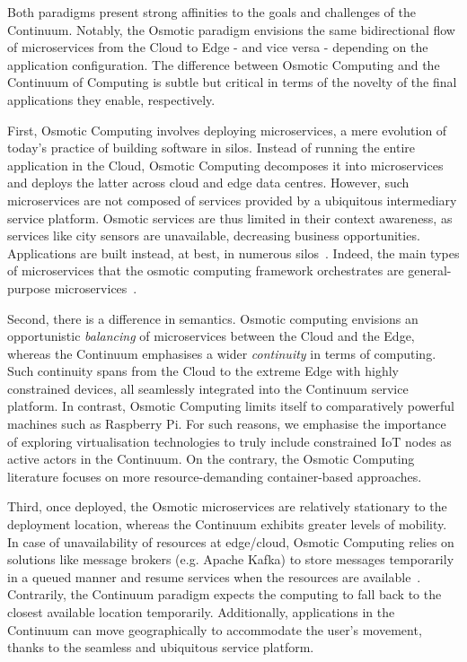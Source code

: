 Both paradigms present strong affinities to the goals and challenges of the Continuum. Notably, the Osmotic paradigm envisions the same bidirectional flow of microservices from the Cloud to Edge - and vice versa - depending on the application configuration. The difference between Osmotic Computing and the Continuum of Computing is subtle but critical in terms of the novelty of the final applications they enable, respectively.

First, Osmotic Computing involves deploying microservices, a mere evolution of today's practice of building software in silos. Instead of running the entire application in the Cloud, Osmotic Computing decomposes it into microservices and deploys the latter across cloud and edge data centres. However, such microservices are not composed of services provided by a ubiquitous intermediary service platform. Osmotic services are thus limited in their context awareness, as services like city sensors are unavailable, decreasing business opportunities. Applications are built instead, at best, in numerous silos~\cite{CAMERO201984}. Indeed, the main types of microservices that the osmotic computing framework orchestrates are general-purpose microservices~\cite{villari2016osmotic}.

Second, there is a difference in semantics. Osmotic computing envisions an opportunistic \textit{balancing} of microservices between the Cloud and the Edge, whereas the Continuum emphasises a wider \textit{continuity} in terms of computing. Such continuity spans from the Cloud to the extreme Edge with highly constrained devices, all seamlessly integrated into the Continuum service platform. In contrast, Osmotic Computing limits itself to comparatively powerful machines such as Raspberry Pi. For such reasons, we emphasise the importance of exploring virtualisation technologies to truly include constrained IoT nodes as active actors in the Continuum. On the contrary, the Osmotic Computing literature focuses on more resource-demanding container-based approaches.

Third, once deployed, the Osmotic microservices are relatively stationary to the deployment location, whereas the Continuum exhibits greater levels of mobility. In case of unavailability of resources at edge/cloud, Osmotic Computing relies on solutions like message brokers (e.g. Apache Kafka) to store messages temporarily in a queued manner and resume services when the resources are available~\cite{neha2022systematic}. Contrarily, the Continuum paradigm expects the computing to fall back to the closest available location temporarily. Additionally, applications in the Continuum can move geographically to accommodate the user's movement, thanks to the seamless and ubiquitous service platform.

